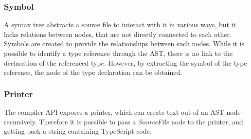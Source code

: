\subsubsection{Symbol}

A syntax tree abstracts a source file to interact with it in various ways, but it lacks relations between nodes, that are not directly connected to each other. Symbols are created to provide the relationships between such nodes. While it is possible to identify a type reference through the AST, there is no link to the declaration of the referenced type. However, by extracting the symbol of the type reference, the node of the type declaration can be obtained.

\subsubsection{Printer}

The compiler API exposes a printer, which can create text out of an AST node recursively. Therefore it is possible to pass a \emph{SourceFile} node to the printer, and getting back a string containing TypeScript code.



